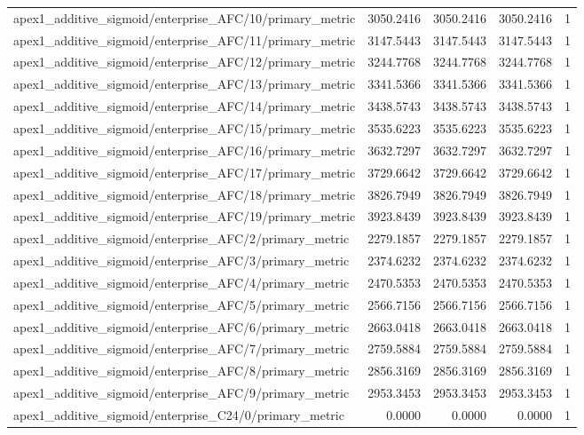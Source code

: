 \begin{table}[h]
\begin{tabular}{lrrrr}
apex1_additive_sigmoid/enterprise_AFC/10/primary_metric & 3050.2416 & 3050.2416 & 3050.2416 & 1 \\
apex1_additive_sigmoid/enterprise_AFC/11/primary_metric & 3147.5443 & 3147.5443 & 3147.5443 & 1 \\
apex1_additive_sigmoid/enterprise_AFC/12/primary_metric & 3244.7768 & 3244.7768 & 3244.7768 & 1 \\
apex1_additive_sigmoid/enterprise_AFC/13/primary_metric & 3341.5366 & 3341.5366 & 3341.5366 & 1 \\
apex1_additive_sigmoid/enterprise_AFC/14/primary_metric & 3438.5743 & 3438.5743 & 3438.5743 & 1 \\
apex1_additive_sigmoid/enterprise_AFC/15/primary_metric & 3535.6223 & 3535.6223 & 3535.6223 & 1 \\
apex1_additive_sigmoid/enterprise_AFC/16/primary_metric & 3632.7297 & 3632.7297 & 3632.7297 & 1 \\
apex1_additive_sigmoid/enterprise_AFC/17/primary_metric & 3729.6642 & 3729.6642 & 3729.6642 & 1 \\
apex1_additive_sigmoid/enterprise_AFC/18/primary_metric & 3826.7949 & 3826.7949 & 3826.7949 & 1 \\
apex1_additive_sigmoid/enterprise_AFC/19/primary_metric & 3923.8439 & 3923.8439 & 3923.8439 & 1 \\
apex1_additive_sigmoid/enterprise_AFC/2/primary_metric & 2279.1857 & 2279.1857 & 2279.1857 & 1 \\
apex1_additive_sigmoid/enterprise_AFC/3/primary_metric & 2374.6232 & 2374.6232 & 2374.6232 & 1 \\
apex1_additive_sigmoid/enterprise_AFC/4/primary_metric & 2470.5353 & 2470.5353 & 2470.5353 & 1 \\
apex1_additive_sigmoid/enterprise_AFC/5/primary_metric & 2566.7156 & 2566.7156 & 2566.7156 & 1 \\
apex1_additive_sigmoid/enterprise_AFC/6/primary_metric & 2663.0418 & 2663.0418 & 2663.0418 & 1 \\
apex1_additive_sigmoid/enterprise_AFC/7/primary_metric & 2759.5884 & 2759.5884 & 2759.5884 & 1 \\
apex1_additive_sigmoid/enterprise_AFC/8/primary_metric & 2856.3169 & 2856.3169 & 2856.3169 & 1 \\
apex1_additive_sigmoid/enterprise_AFC/9/primary_metric & 2953.3453 & 2953.3453 & 2953.3453 & 1 \\
apex1_additive_sigmoid/enterprise_C24/0/primary_metric & 0.0000 & 0.0000 & 0.0000 & 1 \\

\end{tabular}
\end{table}
